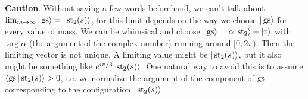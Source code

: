 
\noindent \textbf{Caution}. Without saying a few words beforehand, we can't talk about $\lim_{m\rightarrow \infty} |\operatorname{gs}\rangle = |\operatorname{st}_2(s)\rangle$, for this limit depends on the way we choose $|\operatorname{gs}\rangle$ for every value of mass. We can be whimsical and choose $|\operatorname{gs} \rangle = \alpha |\operatorname{st}_2\rangle + |v\rangle$ with $\arg \alpha$ (the argument of the complex number) running around $[0,2\pi)$. Then the limiting vector is not unique. A limiting value might be $|\operatorname{st}_2(s)\rangle$, but it also might be something like $e^{i\pi/3} |\operatorname{st}_2(s)\rangle$. One natural way to avoid this is to assume $\langle \operatorname{gs} | \operatorname{st}_2(s) \rangle > 0$, i.e. we normalize the argument of the component of $\operatorname{gs}$ corresponding to the configuration $|\operatorname{st}_2(s)\rangle$.


